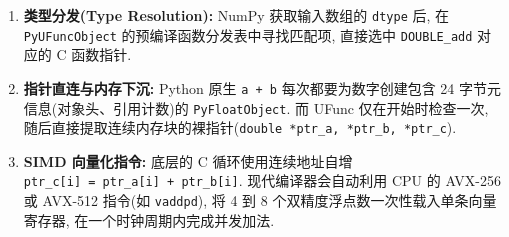 \documentclass[11pt]{article}
\providecommand{\tightlist}{%
      \setlength{\itemsep}{0pt}\setlength{\parskip}{0pt}}
\begin{document}
\begin{enumerate}
\def\labelenumi{\arabic{enumi}.}
\tightlist
\item
  \textbf{类型分发(Type Resolution):} NumPy 获取输入数组的
  \texttt{dtype} 后, 在 \texttt{PyUFuncObject}
  的预编译函数分发表中寻找匹配项, 直接选中 \texttt{DOUBLE\_add} 对应的 C
  函数指针.
\item
  \textbf{指针直连与内存下沉:} Python 原生 \texttt{a\ +\ b}
  每次都要为数字创建包含 24 字节元信息(对象头、引用计数)的
  \texttt{PyFloatObject}. 而 UFunc 仅在开始时检查一次,
  随后直接提取连续内存块的裸指针(\texttt{double\ *ptr\_a,\ *ptr\_b,\ *ptr\_c}).
\item
  \textbf{SIMD 向量化指令:} 底层的 C 循环使用连续地址自增
  \texttt{ptr\_c{[}i{]}\ =\ ptr\_a{[}i{]}\ +\ ptr\_b{[}i{]}}.
  现代编译器会自动利用 CPU 的 AVX-256 或 AVX-512 指令(如
  \texttt{vaddpd}), 将 4 到 8 个双精度浮点数一次性载入单条向量寄存器,
  在一个时钟周期内完成并发加法.
\end{enumerate}
\end{document}
